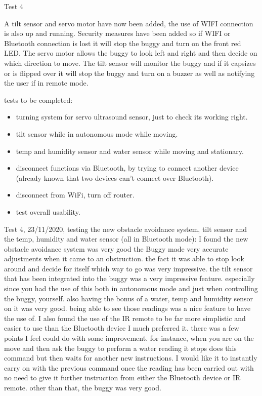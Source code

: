 \documentclass[8pt, a4paper]{article}
\begin{document}
Test 4

A tilt sensor and servo motor have now been added, the use of WIFI connection is also up and running. Security measures have been added so if WIFI or Bluetooth connection is lost it will stop the buggy and turn on the front red LED. The servo motor allows the buggy to look left and right and then decide on which direction to move. The tilt sensor will monitor the buggy and if it capsizes or is flipped over it will stop the buggy and turn on a buzzer as well as notifying the user if in remote mode. 

tests to be completed:
\begin{itemize}
\item turning system for servo ultrasound sensor, just to check its working right.
\item tilt sensor while in autonomous mode while moving. 
\item temp and humidity sensor and water sensor while moving and stationary. 
\item disconnect functions via Bluetooth, by trying to connect another device (already known that two devices can’t connect over Bluetooth).
\item disconnect from WiFi, turn off router. 
\item test overall usability.
\end{itemize}

Test 4, 23/11/2020, testing the new obstacle avoidance system, tilt sensor and the temp, humidity and water sensor (all in Bluetooth mode): I found the new obstacle avoidance system was very good the Buggy made very accurate adjustments when it came to an obstruction. the fact it was able to stop look around and decide for itself which way to go was very impressive. the tilt sensor that has been integrated into the buggy was a very impressive feature. especially since you had the use of this both in autonomous mode and just when controlling the buggy, yourself. also having the bonus of a water, temp and humidity sensor on it was very good. being able to see those readings was a nice feature to have the use of. I also found the use of the IR remote to be far more simplistic and easier to use than the Bluetooth device I much preferred it. there was a few points I feel could do with some improvement. for instance, when you are on the move and then ask the buggy to perform a water reading it stops does this command but then waits for another new instructions. I would like it to instantly carry on with the previous command once the reading has been carried out with no need to give it further instruction from either the Bluetooth device or IR remote. other than that, the buggy was very good.
\end{document}
